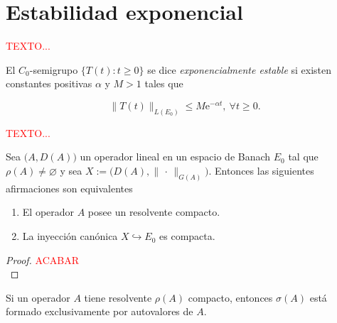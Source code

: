 \section{Estabilidad exponencial}
\label{ch:semigrupos:section:estExp}

\textcolor{red}{TEXTO...}\\

\begin{Definicion}
    \label{ch:semigrupos:section:estExp:def:estExp}

    El $C_0$-semigrupo $\{T(t) : t \geq 0\}$ se dice \textit{exponencialmente estable} si existen constantes positivas $\alpha$ y $M > 1$ tales que

    \[\lVert T(t) \rVert_{L(E_0)} \leq M \mathrm{e}^{-\alpha t}, \ \forall t \geq 0.\]
\end{Definicion}

\textcolor{red}{TEXTO...}\\

\begin{Proposicion}
    \label{ch:semigrupos:section:estExp:prop:compRes}

    Sea $\big(A, D(A)\big)$ un operador lineal en un espacio de Banach $E_0$ tal que $\rho(A) \neq \varnothing$ y sea $X := \big(D(A), \lVert \, \cdot \, \rVert_{G(A)}\big)$\footnotemark. Entonces las siguientes afirmaciones son equivalentes

    \begin{enumerate}
        \item El operador $A$ posee un resolvente compacto.

        \item La inyección canónica $X \hookrightarrow E_0$ es compacta.
    \end{enumerate}
\end{Proposicion}

\begin{proof}
    \textcolor{red}{ACABAR}\\
\end{proof}

\begin{Corolario}
    \label{ch:semigrupos:section:estExp:cor:espectroResComp}

    Si un operador $A$ tiene resolvente $\rho(A)$ compacto, entonces $\sigma(A)$ está formado exclusivamente por autovalores de $A$.
\end{Corolario}

